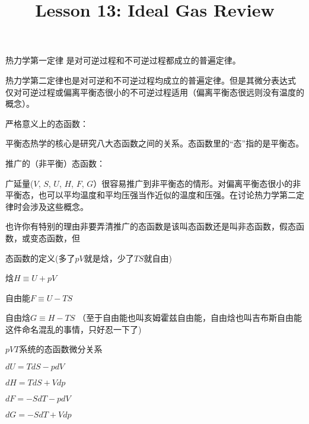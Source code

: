 \documentclass[CJK]{beamer}
\title{Lesson 13: Ideal Gas Review}
\author{}
\date{}
\begin{document}


\begin{frame}
  \bch
  \ech
\end{frame}

\begin{frame}
  \bch
  热力学第一定律
  是对可逆过程和不可逆过程都成立的普遍定律。

  \skipline
  
  热力学第二定律也是对可逆和不可逆过程均成立的普遍定律。但是其微分表达式
  仅对可逆过程或偏离平衡态很小的不可逆过程适用（偏离平衡态很远则没有温度的概念）。  
  \ech
\end{frame}

\begin{frame}
  \bch
  \bitem
  \item{
  严格意义上的态函数：
  
  平衡态热学的核心是研究八大态函数之间的关系。态函数里的``态''指的是平衡态。

}
  \item{
    推广的（非平衡）态函数：
  
    广延量($V$, $S$, $U$, $H$, $F$, $G$）很容易推广到非平衡态的情形。对偏离平衡态很小的非平衡态，也可以平均温度和平均压强当作近似的温度和压强。在讨论热力学第二定律时会涉及这些概念。}
\eitem

  \ech
\end{frame}

\begin{frame}
  \bch

  也许你有特别的理由非要弄清推广的态函数是该叫态函数还是叫非态函数，假态函数，或变态函数，但

  
  \ech
\end{frame}

\begin{frame}
  \bch

  态函数的定义(多了$pV$就是焓，少了$TS$就自由)
  \bitem
\item{\blue 焓$H\equiv U + pV$}
\item{\blue 自由能$F\equiv U - TS$}
\item{\blue 自由焓$G\equiv H - TS$}
  \eitem
{\scriptsize （至于自由能也叫亥姆霍兹自由能，自由焓也叫吉布斯自由能这件命名混乱的事情，只好忍一下了\wulian)}

  \skipline
  
  $pVT$系统的态函数微分关系
  \bitem
\item{\blue $dU = TdS - pdV $}
\item{\blue $dH = TdS + Vdp $}
\item{\blue $dF = -SdT - pdV $}
\item{\blue $dG = -SdT+ Vdp $}
  \eitem
  
  \ech
\end{frame}
\end{document}
